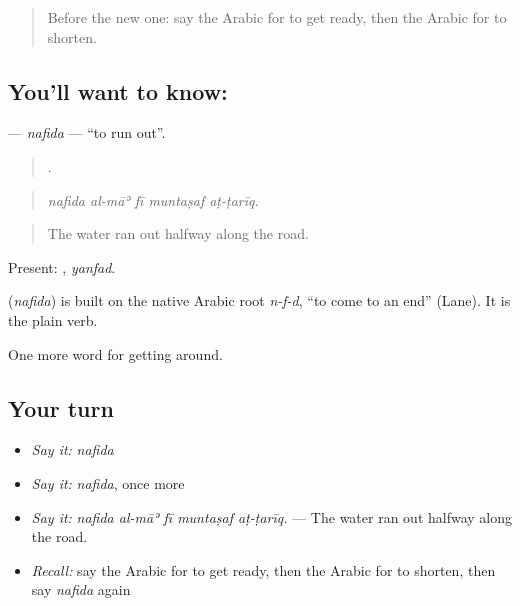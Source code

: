 \label{lesson:AR-C462-nafida}



\begin{quote}
Before the new one: say the Arabic for to get ready, then the Arabic for to shorten.
\end{quote}

\subsection*{You'll want to know: }
\textbf{} — \emph{nafida} — \textquotedblleft{}to run out\textquotedblright{}.

\begin{quote}
    .
\end{quote}

\begin{quote}
\emph{nafida al-māʾ fī muntaṣaf aṭ-ṭarīq.}
\end{quote}

\begin{quote}
The water ran out halfway along the road.
\end{quote}

Present: , \emph{yanfad}.

\begin{cousinweb}
\textbf{} (\emph{nafida}) is built on the native Arabic root \emph{n-f-d}, \textquotedblleft{}to come to an end\textquotedblright{} (Lane). It is the plain verb.
\end{cousinweb}

\begin{grammarlens}[title={What you've built}]
One more word for getting around.
\end{grammarlens}

\subsection*{Your turn}
\begin{itemize}
\raggedright
  \item \emph{Say it:} \emph{nafida}
  \item \emph{Say it:} \emph{nafida}, once more
  \item \emph{Say it:} \emph{nafida al-māʾ fī muntaṣaf aṭ-ṭarīq.} — The water ran out halfway along the road.
  \item \emph{Recall:} say the Arabic for to get ready, then the Arabic for to shorten, then say \emph{nafida} again
\end{itemize}

